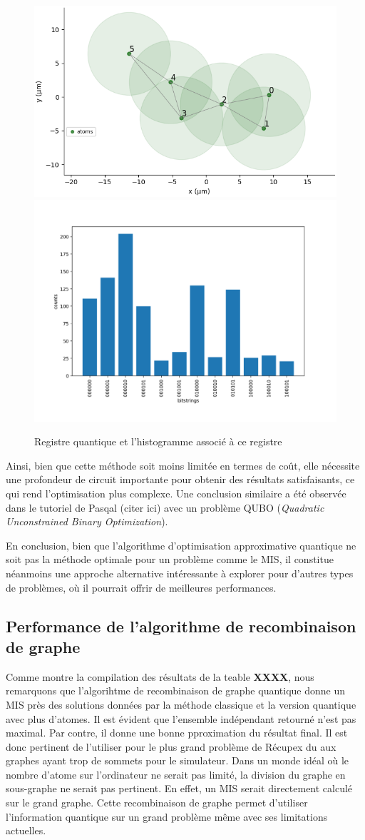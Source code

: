 \documentclass[11pt]{article}
\begin{document}
\begin{figure}[H]
    \centering
    \includegraphics[width = 0.48\linewidth]{images/registre_exemple2.png}
    \includegraphics[width=0.49\linewidth]{images/histogram_exemple2.png}
    \caption{Registre quantique et l'histogramme associé à ce registre}
    \label{QMIS_exemple}
\end{figure}

Ainsi, bien que cette méthode soit moins limitée en termes de coût, elle nécessite une profondeur de circuit importante pour obtenir des résultats satisfaisants, ce qui rend l'optimisation plus complexe. Une conclusion similaire a été observée dans le tutoriel de Pasqal (citer ici) avec un problème QUBO (\textit{Quadratic Unconstrained Binary Optimization}).

En conclusion, bien que l'algorithme d'optimisation approximative quantique ne soit pas la méthode optimale pour un problème comme le MIS, il constitue néanmoins une approche alternative intéressante à explorer pour d'autres types de problèmes, où il pourrait offrir de meilleures performances.

\subsection{Performance de l'algorithme de recombinaison de graphe}
Comme montre la compilation des résultats de la teable \textbf{XXXX}, nous remarquons que l'algorihtme de recombinaison de graphe quantique donne un MIS près des solutions données par la méthode classique et la version quantique avec plus d'atomes. Il est évident que l'ensemble indépendant retourné n'est pas maximal. Par contre, il donne une bonne pproximation du résultat final. Il est donc pertinent de l'utiliser pour le plus grand problème de Récupex du aux graphes ayant trop de sommets pour le simulateur. Dans un monde idéal où le nombre d'atome sur l'ordinateur ne serait pas limité, la division du graphe en sous-graphe ne serait pas pertinent. En effet, un MIS serait directement calculé sur le grand graphe. Cette recombinaison de graphe permet d'utiliser l'information quantique sur un grand problème même avec ses limitations actuelles. 
\end{document}
